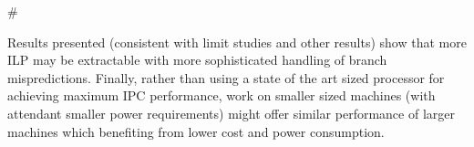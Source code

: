 #\documentclass[10pt,dvips]{article}
\begin{document}
Results presented (consistent with limit studies and other
results) show that more ILP may be extractable with more
sophisticated handling of branch mispredictions.
Finally, rather than using a state of the art sized processor
for achieving maximum IPC performance, work on smaller sized machines
(with attendant smaller power requirements) might offer similar
performance of larger machines which benefiting from lower cost
and power consumption.
%


%
\end{document}

